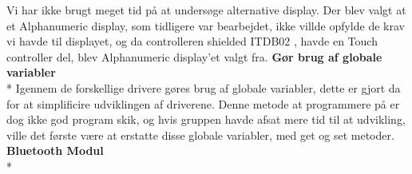 Vi har ikke brugt meget tid på at undersøge alternative display. Der blev valgt at et Alphanumeric display, som tidligere var bearbejdet, ikke villde opfylde de krav vi havde til displayet, og da controlleren shielded ITDB02 
, havde en Touch controller del, blev Alphanumeric display'et valgt fra.
\newline
\newline
\textbf{Gør brug af globale variabler} \\*
Igennem de forskellige drivere gøres brug af globale variabler, dette er gjort da for at simplificire udviklingen af driverene. Denne metode at programmere på er dog ikke god program skik, og hvis gruppen havde afsat mere tid til at udvikling, ville det første være at erstatte disse globale variabler, med get og set metoder. 
\newline
\newline
\textbf{Bluetooth Modul} \\*
  
